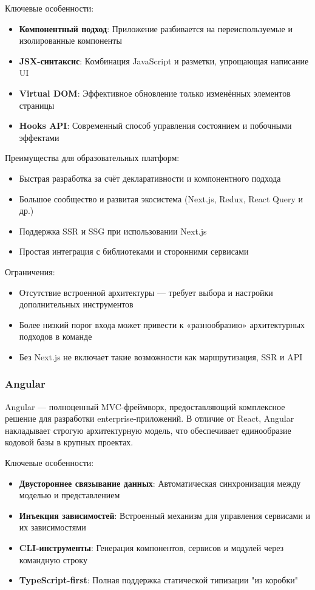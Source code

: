 Ключевые особенности:
\begin{itemize}
\item \textbf{Компонентный подход}: Приложение разбивается на переиспользуемые и изолированные компоненты
\item \textbf{JSX-синтаксис}: Комбинация JavaScript и разметки, упрощающая написание UI
\item \textbf{Virtual DOM}: Эффективное обновление только изменённых элементов страницы
\item \textbf{Hooks API}: Современный способ управления состоянием и побочными эффектами
\end{itemize}

Преимущества для образовательных платформ:
\begin{itemize}
\item Быстрая разработка за счёт декларативности и компонентного подхода
\item Большое сообщество и развитая экосистема (Next.js, Redux, React Query и др.)
\item Поддержка SSR и SSG при использовании Next.js
\item Простая интеграция с библиотеками и сторонними сервисами
\end{itemize}

Ограничения:
\begin{itemize}
\item Отсутствие встроенной архитектуры — требует выбора и настройки дополнительных инструментов
\item Более низкий порог входа может привести к «разнообразию» архитектурных подходов в команде
\item Без Next.js не включает такие возможности как маршрутизация, SSR и API
\end{itemize}


\subsubsection{Angular}
Angular — полноценный MVC-фреймворк, предоставляющий комплексное решение для разработки enterprise-приложений. В отличие от React, Angular накладывает строгую архитектурную модель, что обеспечивает единообразие кодовой базы в крупных проектах. 

Ключевые особенности:
\begin{itemize}
\item \textbf{Двустороннее связывание данных}: Автоматическая синхронизация между моделью и представлением
\item \textbf{Инъекция зависимостей}: Встроенный механизм для управления сервисами и их зависимостями
\item \textbf{CLI-инструменты}: Генерация компонентов, сервисов и модулей через командную строку
\item \textbf{TypeScript-first}: Полная поддержка статической типизации "из коробки"
\end{itemize}

